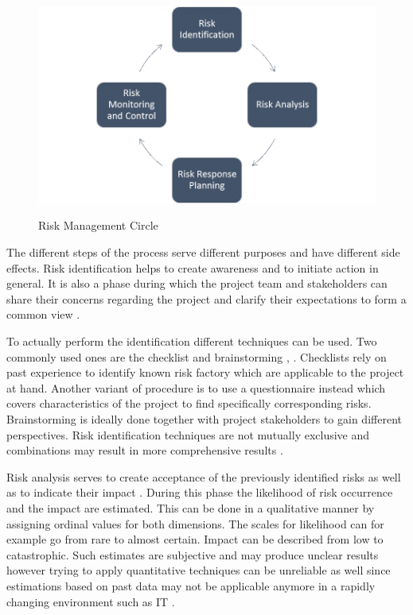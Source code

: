 \begin{figure}[htbp] 
	\centering
	\includegraphics[width=1.0\textwidth]{Content/Theory/RiskManagementCycle.png}
	\caption{Risk Management Circle}
	\cite{own representation}
	\label{fig:riskmanagmentcycle}
\end{figure}

The different steps of the process serve different purposes and have different side effects. Risk identification helps to create awareness and to initiate action in general. It is also a phase during which the project team and stakeholders can share their concerns regarding the project and clarify their expectations to form a common view \cite{didragaRoleEffectsRisk2013}.

To actually perform the identification different techniques can be used. Two commonly used ones are the checklist and brainstorming \cite{islamSoftwareDevelopmentRisk2011}, \cite{didragaRoleEffectsRisk2013}. Checklists rely on past experience to identify known risk factory which are applicable to the project at hand. Another variant of procedure is to use a questionnaire instead which covers characteristics of the project to find specifically corresponding risks. Brainstorming is ideally done together with project stakeholders to gain different perspectives. Risk identification techniques are not mutually exclusive and combinations may result in more comprehensive results \cite{islamSoftwareDevelopmentRisk2011}.

Risk analysis serves to create acceptance of the previously identified risks as well as to indicate their impact \cite{didragaRoleEffectsRisk2013}. During this phase the likelihood of risk occurrence and the impact are estimated. This can be done in a qualitative manner by assigning ordinal values for both dimensions. The scales for likelihood can for example go from rare to almost certain. Impact can be described from low to catastrophic. Such estimates are subjective and may produce unclear results however trying to apply quantitative techniques can be unreliable as well since estimations based on past data may not be applicable anymore in a rapidly changing environment such as IT \cite{islamSoftwareDevelopmentRisk2011}.

